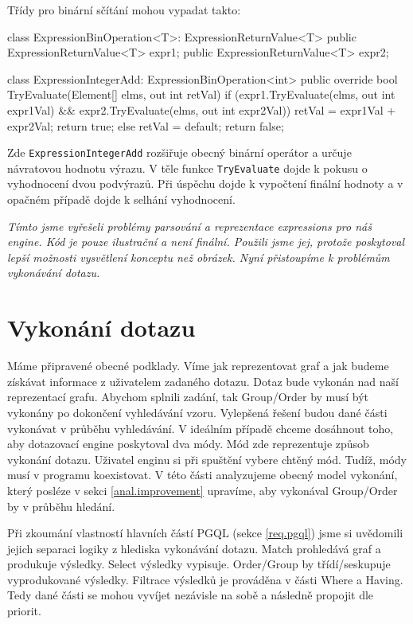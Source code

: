 Třídy pro binární sčítání mohou vypadat takto:
\begin{code}
class ExpressionBinOperation<T>: ExpressionReturnValue<T> {
  public ExpressionReturnValue<T> expr1;
  public ExpressionReturnValue<T> expr2;
}

class ExpressionIntegerAdd: ExpressionBinOperation<int>{
  public override bool TryEvaluate(Element[] elms, out int retVal) {
    if (expr1.TryEvaluate(elms, out int expr1Val) &&
        expr2.TryEvaluate(elms, out int expr2Val)) {
      retVal = expr1Val + expr2Val;
      return true;
    } else {
      retVal = default;
      return false;
    }
  }
}
\end{code}
Zde \texttt{ExpressionIntegerAdd} rozšiřuje obecný binární operátor a určuje návratovou hodnotu výrazu.
V těle funkce \texttt{TryEvaluate} dojde k pokusu o vyhodnocení dvou podvýrazů.
Při úspěchu dojde k vypočtení finální hodnoty a v opačném případě dojde k selhání vyhodnocení. 

\bigskip
\textit{Tímto jsme vyřešeli problémy parsování a reprezentace expressions pro náš engine.
Kód je pouze ilustrační a není finální.
Použili jsme jej, protože poskytoval lepší možnosti vysvětlení konceptu než obrázek.
Nyní přistoupíme k problémům vykonávání dotazu.}

\clearpage

\section{Vykonání dotazu} \label{anal.vykonanidotazu}

Máme připravené obecné podklady.
Víme jak reprezentovat graf a jak budeme získávat informace z uživatelem zadaného dotazu.
Dotaz bude vykonán nad naší reprezentací grafu.
Abychom splnili zadání, tak Group/Order by musí být vykonány po dokončení vyhledávání vzoru.
Vylepšená řešení budou dané části vykonávat v průběhu vyhledávání.
V ideálním případě chceme dosáhnout toho, aby dotazovací engine poskytoval dva módy.
Mód zde reprezentuje způsob vykonání dotazu.
Uživatel enginu si při spuštění vybere chtěný mód.
Tudíž, módy musí v programu koexistovat.
V této části analyzujeme obecný model vykonání, který posléze v sekci \ref{anal.improvement} upravíme, aby vykonával Group/Order by v průběhu hledání.

Při zkoumání vlastností hlavních částí PGQL (sekce \ref{req.pgql}) jsme si uvědomili jejich separaci logiky z hlediska vykonávání dotazu.
Match prohledává graf a produkuje výsledky. 
Select výsledky vypisuje. 
Order/Group by třídí/seskupuje vyprodukované výsledky.
Filtrace výsledků je prováděna v části Where a Having.
Tedy dané části se mohou vyvíjet nezávisle na sobě a následně propojit dle priorit.

